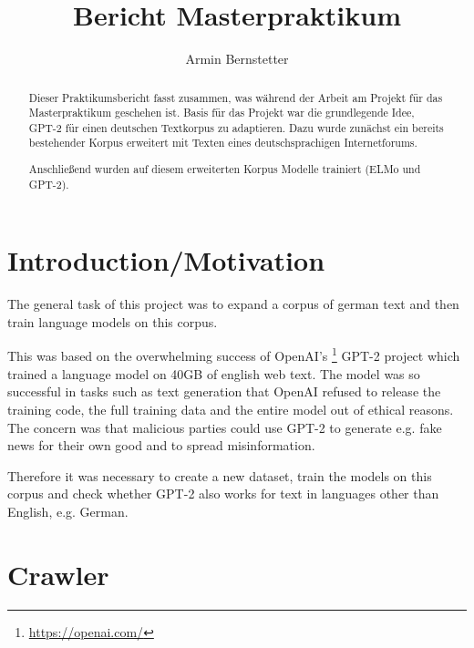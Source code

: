 \documentclass{scrartcl}
\begin{document}

\title{Bericht Masterpraktikum}

\author{Armin Bernstetter}

\maketitle

\begin{abstract}
Dieser Praktikumsbericht fasst zusammen, was während der Arbeit am Projekt für das Masterpraktikum geschehen ist. Basis für das Projekt war die grundlegende Idee, GPT-2 für einen deutschen Textkorpus zu adaptieren. Dazu wurde zunächst ein bereits bestehender Korpus erweitert mit Texten eines deutschsprachigen Internetforums. 

Anschließend wurden auf diesem erweiterten Korpus Modelle trainiert (ELMo und GPT-2).
\end{abstract}





\section{Introduction/Motivation}

The general task of this project was to expand a corpus of german text and then train language models on this corpus.

This was based on the overwhelming success of OpenAI's \footnote{\url{https://openai.com/}} GPT-2 project \cite{radford2019language} which trained a language model on 40GB of english web text. The model was so successful in tasks such as text generation that OpenAI refused to release the training code, the full training data and the entire model out of ethical reasons. The concern was that malicious parties could use GPT-2 to generate e.g. fake news for their own good and to spread misinformation.

Therefore it was necessary to create a new dataset, train the models on this corpus and check whether GPT-2 also works for text in languages other than English, e.g. German.


\section{Crawler}
\end{document}
